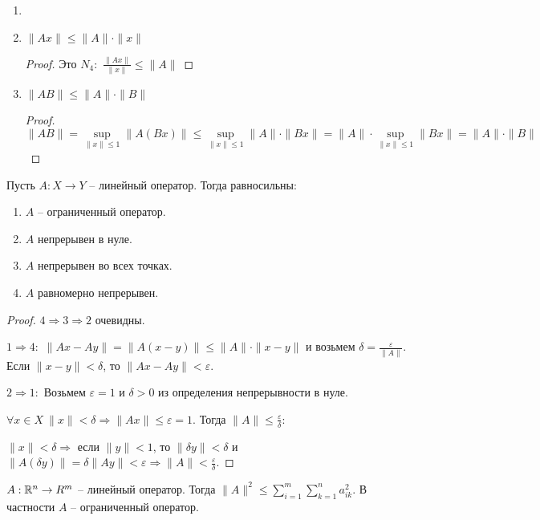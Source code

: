 \begin{corollary}
\begin{enumerate}
    \item[]
    \item $\|Ax\|\leq \|A\|\cdot \|x\|$
    \begin{proof}
        Это $N_4:$ $\frac{\|Ax\|}{\|x\|}\leq \|A\|$
    \end{proof}

    \item $\|AB\|\leq \|A\|\cdot \|B\|$
    \begin{proof}
        $\|AB\|=\sup\limits_{\|x\|\leq 1}\|A(Bx)\|\leq\sup\limits_{\|x\|\leq 1}\|A\|\cdot \|Bx\|=\|A\|\cdot \sup\limits_{\|x\|\leq 1}\|Bx\|=\|A\|\cdot \|B\|$
    \end{proof}
\end{enumerate}
\end{corollary}

\begin{theorem}
    Пусть $A:X\rightarrow Y$ – линейный оператор. Тогда равносильны:
    \begin{enumerate}
        \item $A$ – ограниченный оператор.
        \item $A$ непрерывен в нуле.
        \item $A$ непрерывен во всех точках.
        \item $A$ равномерно непрерывен.
    \end{enumerate}
\end{theorem}

\begin{proof}
    $4\Rightarrow 3\Rightarrow 2$ очевидны.

    $1\Rightarrow 4:$ $\|Ax-Ay\|=\|A(x-y)\|\leq \|A\|\cdot \|x-y\|$ и возьмем $\delta=\frac{\varepsilon}{\|A\|}$. Если $\|x-y\|<\delta$, то $\|Ax-Ay\|<\varepsilon$.

    $2\Rightarrow 1:$ Возьмем $\varepsilon =1$ и  $\delta>0$ из определения непрерывности в нуле. 

    $\forall x\in X\ \|x\|<\delta \Rightarrow \|Ax\|\leq\varepsilon =1$. Тогда $\|A\|\leq \frac{\varepsilon}{\delta}$:

    $\|x\|<\delta\Rightarrow$ если $\|y\|<1$, то $\|\delta y\|<\delta$ и $\|A(\delta y)\|=\delta\|A y\|<\varepsilon\Rightarrow \|A\|<\frac{\varepsilon}{\delta}$.
\end{proof}

\begin{theorem}
    $A:\mathbb{R}^n\rightarrow R^m$ – линейный оператор. Тогда $\|A\|^2\leq \sum\limits_{i=1}^m\sum\limits_{k=1}^n a^2_{ik}$. В частности $A$ – ограниченный оператор.
\end{theorem}

